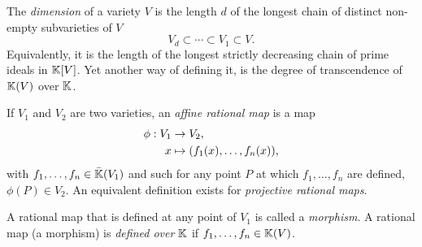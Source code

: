 The \emph{dimension} of a variety $V$
is the length $d$ of the longest chain of distinct non-empty
subvarieties of $V$
\begin{equation}
  \label{eq:219}
  V_d \subset \cdots \subset V_1 \subset V
  \text{.}
\end{equation}
Equivalently, it is the length of the longest strictly decreasing
chain of prime ideals in $\mathbb{K}[V]$. Yet another way of defining it, is
the degree of transcendence of $\mathbb{K}(V)$ over $\mathbb{K}$.

If $V_1$ and $V_2$ are two varieties, an
\emph{affine rational map} is a map
\begin{equation}
  \label{eq:220}
  \begin{aligned}
    \phi : V_1&\rightarrow V_2\text{,}\\
    x &\mapsto (f_1(x),\ldots,f_n(x))\text{,}
  \end{aligned}
\end{equation}
with $f_1,\ldots,f_n\in\bar{\mathbb{K}}(V_1)$ and such for any point $P$ at
which $f_1,\ldots,f_n$ are defined, $\phi(P)\in V_2$. An equivalent
definition exists for \emph{projective rational maps}.

A rational map that is defined at any point of $V_1$ is called a
\emph{morphism}. A rational map (a
morphism) is
\emph{defined
  over} $\mathbb{K}$ if $f_1,\ldots,f_n\in\mathbb{K}(V)$.





